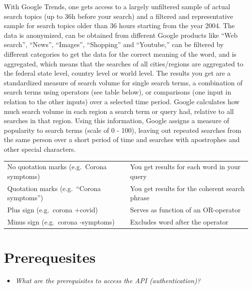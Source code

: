 \documentclass[
]{book}
\providecommand{\tightlist}{%
  \setlength{\itemsep}{0pt}\setlength{\parskip}{0pt}}
\begin{document}
With Google Trends, one gets access to a largely unfiltered sample of actual search topics (up to 36h before your search) and a filtered and representative sample for search topics older than 36 hours starting from the year 2004. The data is anonymized, can be obtained from different Google products like ``Web search'', ``News'', ``Images'', ``Shopping'' and ``Youtube,'' can be filtered by different categories to get the data for the correct meaning of the word, and is aggregated, which means that the searches of all cities/regions are aggregated to the federal state level, country level or world level. The results you get are a standardized measure of search volume for single search terms, a combination of search terms using operators (see table below), or comparisons (one input in relation to the other inputs) over a selected time period. Google calculates how much search volume in each region a search term or query had, relative to all searches in that region. Using this information, Google assigns a measure of popularity to search terms (scale of 0 - 100), leaving out repeated searches from the same person over a short period of time and searches with apostrophes and other special characters.

\begin{longtable}[]{@{}
  >{\raggedright\arraybackslash}p{}
  >{\raggedright\arraybackslash}p{}@{}}
\toprule
\endhead
No quotation marks (e.g.~Corona symptoms) & You get results for each word in your query \\
Quotation marks (e.g.~``Corona symptoms'') & You get results for the coherent search phrase \\
Plus sign (e.g.~corona +covid) & Serves as function of an OR-operator \\
Minus sign (e.g.~corona -symptoms) & Excludes word after the operator \\
\bottomrule
\end{longtable}

\hypertarget{prerequesites-7}{%
\section{Prerequesites}\label{prerequesites-7}}

\begin{itemize}
\tightlist
\item
  \emph{What are the prerequisites to access the API (authentication)? }
\end{itemize}
\end{document}
